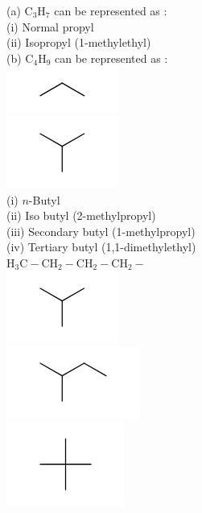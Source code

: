 \documentclass[10pt]{article}
\begin{document}
(a) $\mathrm{C}_{3} \mathrm{H}_{7}$ can be represented as :\\
(i) Normal propyl\\
(ii) Isopropyl (1-methylethyl)\\
(b) $\mathrm{C}_{4} \mathrm{H}_{9}$ can be represented as :\\
\includegraphics{smile-75aa6e93f5fdf6929b2c1b70472d597d21d35bde}\\
\includegraphics{smile-133c33ba23c66a493bce57678208596a1cb9ec13}\\
(i) $n$-Butyl\\
(ii) Iso butyl (2-methylpropyl)\\
(iii) Secondary butyl (1-methylpropyl)\\
(iv) Tertiary butyl (1,1-dimethylethyl)\\
$\mathrm{H}_{3} \mathrm{C}-\mathrm{CH}_{2}-\mathrm{CH}_{2}-\mathrm{CH}_{2}-$\\
\includegraphics{smile-6a8070635c622907c0602f1cd2d5385829cba4b5}\\
\includegraphics{smile-9b18206269c0e5315168c818cada3508c4456958}\\
\includegraphics{smile-1b16cdc8f93c395f76114e6dea46fbed71b8157e}\\
\end{document}
